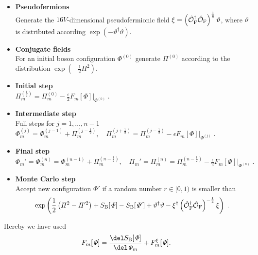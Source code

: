 \begin{itemize}
\item \textbf{Pseudofermions}\\
Generate the $16V$-dimensional pseudofermionic field $\xi = \left(\hat{\mathcal{O}}_{\rm F}^{\dagger}\hat{\mathcal{O}}_{\rm F}\right)^{\frac{1}{8}} \vartheta$, where $\vartheta$ is distributed according $\exp\left(-\vartheta^{\dagger}\vartheta\right)$.
%
%
\item \textbf{Conjugate fields}\\
For an initial boson configuration $\mathit{\Phi}^{(0)}$ generate $\mathit{\Pi}^{(0)}$ according to the  distribution $\exp \left(-\frac{1}{2}\mathit{\Pi}^{2}\right)$.
%
%
\item \textbf{Initial step}\\
$\mathit{\Pi}_{m}^{(\frac{1}{2})} = \mathit{\Pi}_{m}^{(0)} - \frac{\epsilon}{2} F_{m}[\mathit{\Phi}]\Big\vert_{\mathit{\Phi}^{(0)}}  \;.$
%
%
\item \textbf{Intermediate step}\\
Full steps for $j=1,\ldots,n-1$ \\[0.2cm]
$\mathit{\Phi}_{m}^{(j)} = \mathit{\Phi}_{m}^{(j-1)} + \mathit{\Pi}_{m}^{(j-\frac{1}{2})}, \quad  \mathit{\Pi}_{m}^{(j+\frac{1}{2})} = \mathit{\Pi}_{m}^{(j-\frac{1}{2})} - \epsilon F_{m}[\mathit{\Phi}]\Big\vert_{\mathit{\Phi}^{(j)}}\;.$
%
%
\item \textbf{Final step}\\
$\mathit{\Phi}_{m}' = \mathit{\Phi}_{m}^{(n)} = \mathit{\Phi}_{m}^{(n-1)} + \mathit{\Pi}_{m}^{(n-\frac{1}{2})}, \quad \mathit{\Pi}_{m}' = \mathit{\Pi}_{m}^{(n)} = \mathit{\Pi}_{m}^{(n-\frac{1}{2})} - \frac{\epsilon}{2} F_{m}[\mathit{\Phi}]\Big\vert_{\mathit{\Phi}^{(n)}}\;.$
%
%
\item \textbf{Monte Carlo step}\\
Accept new configuration $\mathit{\Phi}'$ if a random number $r \in [0,1)$ is smaller than
\[\exp\left(\frac{1}{2}\left(\mathit{\Pi}^{2}-\mathit{\Pi}'^{2}\right) + S_{\rm B}[\mathit{\Phi}]- S_{\rm B}[\mathit{\Phi}'] +\vartheta^{\dagger}\vartheta - \xi^{\dagger} \left(\hat{\mathcal{O}}_{\rm F}^{\dagger}\hat{\mathcal{O}}_{\rm F}\right)^{-\frac{1}{4}} \xi \right) \;.  \]
\end{itemize}
%
%
Hereby we have used 
%
%
\begin{equation}
F_{m}[\mathit{\Phi}] = \frac{\del S_{\rm B}[\mathit{\Phi}]}{\del \mathit{\Phi}_{m}} + F_{m}^{\xi}[\mathit{\Phi}].
\end{equation}